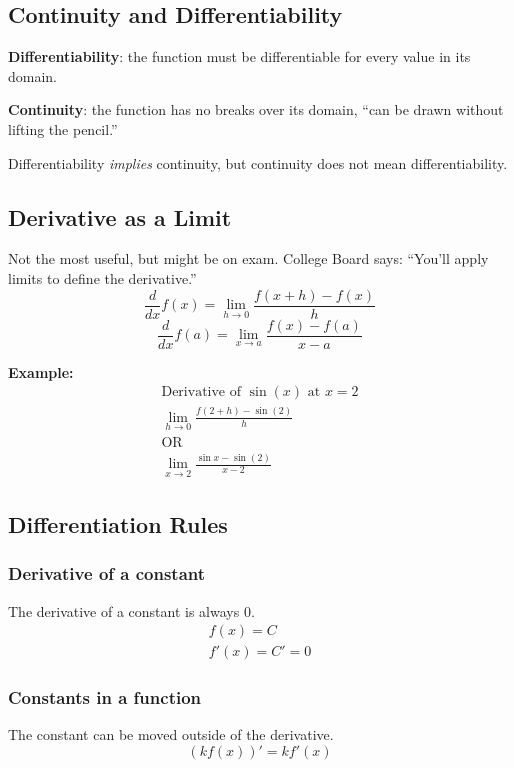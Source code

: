 \documentclass[12pt]{article}
\begin{document}
        \subsection{Continuity and Differentiability}
            \noindent \textbf{Differentiability}: the function must be differentiable for every value in its domain.

            \noindent \textbf{Continuity}: the function has no breaks over its domain, ``can be drawn without lifting the pencil.''

            \noindent Differentiability \textit{implies} continuity, but continuity does not mean differentiability.

        \subsection{Derivative as a Limit}
            Not the most useful, but might be on exam. College Board says: ``You'll apply limits to define the derivative.''
            \[ \frac{d}{dx} f(x) = \lim_{h \to 0} \frac{f(x+h) - f(x)}{h} \]
            \[ \frac{d}{dx} f(a) = \lim_{x \to a} \frac{f(x) - f(a)}{x-a} \]

            \noindent \textbf{Example:}
            \begin{gather*}
                \text{Derivative of $\sin(x)$ at $x=2$} \\
                \lim_{h \to 0} \frac{f(2+h) - \sin{(2)}}{h} \\
                \text{OR} \\
                \lim_{x \to 2} \frac{\sin{x} - \sin{(2)}}{x-2}
            \end{gather*}

        \subsection{Differentiation Rules}
            \subsubsection{Derivative of a constant}
                \noindent The derivative of a constant is always $0$.
                \begin{gather*}
                    f(x) = C \\
                    f'(x) = C' = 0
                \end{gather*}

            \subsubsection{Constants in a function}
                \noindent The constant can be moved outside of the derivative.
                \[ \left( k f(x) \right)' = k f'(x) \]
\end{document}
